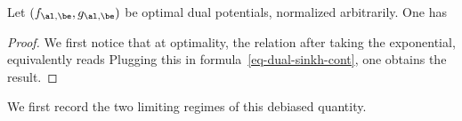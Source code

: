 \begin{lem}
		Let $(f_{\al,\be},g_{\al,\be})$ be optimal dual potentials, normalized arbitrarily. One has
\end{lem}
\begin{proof}
	We first notice that at optimality, the relation
	after taking the exponential, equivalently reads
	Plugging this in formula~\eqref{eq-dual-sinkh-cont}, one obtains the result.
\end{proof}


%
We first record the two limiting regimes of this debiased quantity.


